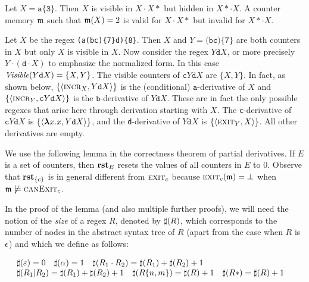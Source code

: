 \begin{ex}
  Let $X=\texttt{a\{3\}}$. Then $X$ is visible in $X\cdot X*$ but hidden
  in $X{*}\cdot X$. A counter memory $\mem$ such that $\mem(X)=2$ is valid for $X\cdot X*$
  but invalid for $X{*}\cdot X$.
\end{ex}

\begin{ex}
Let $X$ be the regex \texttt{(a(bc)\{7\}d)\{8\}}. Then $X$ and $Y =
\texttt{(bc)\{7\}}$ are both counters in $X$ but only $X$ is visible
in $X$.  Now consider the regex $Y\texttt{d}X$, or more precisely
$Y\cdot (\texttt{d}\cdot X)$ to emphasize the normalized form.  In
this case $\VISIBLE{Y\texttt{d}X}=\{X,Y\}$.  The visible counters of
$\texttt{c}Y\texttt{d}X$ are $\{X,Y\}$.  In fact, as shown below,
$\spair{\IncrOp[X]}{Y\texttt{d}X}$ is the (conditional)
$\texttt{a}$-derivative of $X$ and
$\spair{\IncrOp[Y]}{\texttt{c}Y\texttt{d}X}$ is the
$\texttt{b}$-derivative of $Y\texttt{d}X$.
These are in fact the only possible regexes that arise here through derivation starting with $X$.
The \texttt{c}-derivative of $\texttt{c}Y\texttt{d}X$ is
$\spair{\blambda x.x}{Y\texttt{d}X}$, and the \texttt{d}-derivative of
$Y\texttt{d}X$ is $\spair{\ExitOp[Y]}{X}$. All other derivatives are empty.
\end{ex}

We use the following lemma in the correctness theorem of partial derivatives.
If $E$ is a set of counters, then $\RESET{E}$ resets the values of all counters
in $E$ to 0. Observe that $\RESET{\{c\}}$ is in general different from
$\ExitOp[c]$ because $\ExitOp[c](\mem)=\bot$ when $\mem\not\models\CanExit{c}$.

In the proof of the lemma (and also multiple further proofs), we will need the
notion of the \emph{size} of a regex $R$, denoted by $\SIZEOF{R}$, which
corresponds to the number of nodes in the abstract syntax tree of $R$
(apart from the case when $R$ is $\eps$) and which we define as follows:

\[
\begin{array}{l}
\SIZEOF{\emp}=0\quad \SIZEOF{\pred{\alpha}}=1 \quad
\SIZEOF{R_1\cdot R_2} = \SIZEOF{R_1}+\SIZEOF{R_2}+1\quad \\
    \SIZEOF{R_1 | R_2} = \SIZEOF{R_1}+\SIZEOF{R_2}+1\quad
    \SIZEOF{R\{n,m\}}=\SIZEOF{R}+1\quad
    \SIZEOF{R{*}}=\SIZEOF{R}+1\quad
\end{array}
\]

